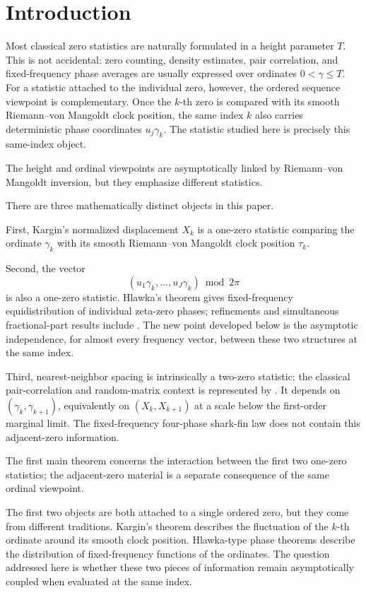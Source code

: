 \documentclass[pdflatex,sn-mathphys-num]{sn-jnl}
\numberwithin{equation}{section}
\theoremstyle{thmstyleone}
\theoremstyle{thmstylethree}
\theoremstyle{thmstyletwo}
\newcommand{\1}{\mathbf 1}
\begin{document}
\section{Introduction}

Most classical zero statistics are naturally formulated in a
height parameter \(T\).  This is not accidental: zero counting,
density estimates, pair correlation, and fixed-frequency phase
averages are usually expressed over ordinates \(0<\gamma\le T\).
For a statistic attached to the individual zero, however, the
ordered sequence viewpoint is complementary.  Once the \(k\)-th
zero is compared with its smooth Riemann--von Mangoldt clock
position, the same index \(k\) also carries deterministic phase
coordinates \(u_j\gamma_k\).  The statistic studied here is
precisely this same-index object.

The height and ordinal viewpoints are asymptotically linked by
Riemann--von Mangoldt inversion, but they emphasize different
statistics.

There are three mathematically distinct objects in this paper.

First, Kargin's normalized displacement $X_k$ is a one-zero statistic comparing the ordinate $\gamma_k$ with its smooth Riemann--von Mangoldt clock position $\tau_k$.

Second, the vector
\[
 (u_1\gamma_k,\ldots,u_J\gamma_k)\bmod2\pi
\]
is also a one-zero statistic.  Hlawka's theorem \cite{Hlawka1975} gives fixed-frequency equidistribution of individual zeta-zero phases; refinements and simultaneous fractional-part results include \cite{Fujii1978,FordZaharescu2005,FordMengZaharescu2017}.  The new point developed below is the asymptotic independence, for almost every frequency vector, between these two structures at the same index.

Third, nearest-neighbor spacing is intrinsically a two-zero statistic; the classical pair-correlation and random-matrix context is represented by \cite{Montgomery1973,RudnickSarnak1996}.  It depends on $(\gamma_k,\gamma_{k+1})$, equivalently on $(X_k,X_{k+1})$ at a scale below the first-order marginal limit.  The fixed-frequency four-phase shark-fin law does not contain this adjacent-zero information.

The first main theorem concerns the interaction between the first two
one-zero statistics; the adjacent-zero material is a separate consequence
of the same ordinal viewpoint.

The first two objects are both attached to a single ordered zero,
but they come from different traditions.  Kargin's theorem
describes the fluctuation of the \(k\)-th ordinate around its
smooth clock position.  Hlawka-type phase theorems describe the
distribution of fixed-frequency functions of the ordinates.  The
question addressed here is whether these two pieces of information
remain asymptotically coupled when evaluated at the same index.
\end{document}
